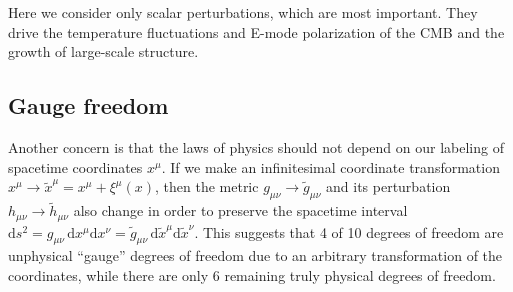\documentclass[USenglish, thumbmarks]{uiophdthesis} %
\newcommand\diff{\mathrm{d}}
\begin{document}
Here we consider only scalar perturbations, which are most important.
They drive the temperature fluctuations and E-mode polarization of the CMB
and the growth of large-scale structure.

\subsection{Gauge freedom}
\label{sec:gauge}

Another concern is that the laws of physics should not depend on our labeling of spacetime coordinates $x^\mu$.
If we make an infinitesimal coordinate transformation $x^\mu \to \tilde{x}^\mu = x^\mu + \xi^\mu(x)$,
then the metric $g_{\mu\nu} \to \tilde{g}_{\mu\nu}$ and its perturbation $h_{\mu\nu} \to \tilde{h}_{\mu\nu}$ also change
in order to preserve the spacetime interval $\diff{s}^2 = g_{\mu\nu} \, \diff{x}^\mu \diff{x}^\nu = \tilde{g}_{\mu\nu} \, \diff{\tilde{x}}^\mu \diff{\tilde{x}}^\nu$.
This suggests that 4 of 10 degrees of freedom are unphysical \enquote{gauge} degrees of freedom due to an arbitrary transformation of the coordinates,
while there are only 6 remaining truly physical degrees of freedom.
\end{document}
